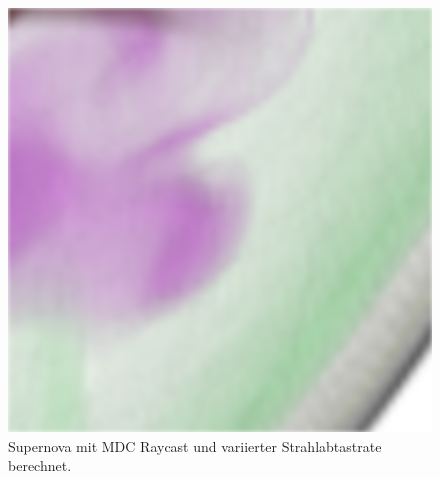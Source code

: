\begin{figure}[]
\begin{minipage}[t]{0.3\textwidth}
	\end{minipage}
	\hfill
	\begin{minipage}[t]{0.3\textwidth}
		\centering
		\includegraphics[width=1\textwidth]{../../Neue_Messungen/Supernova/cut/mdc_ors/mdc_ors_3.png}
	\end{minipage}
	\caption{Supernova mit MDC Raycast und variierter Strahlabtastrate berechnet.}
	\label{fig::res::sn_comp_mdc_ors}
\end{figure}

